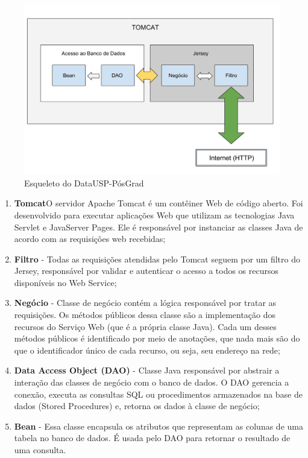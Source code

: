 \begin{figure}[H]
    \includegraphics[width=\textwidth]{figuras/skel}
    \caption{Esqueleto do DataUSP-PósGrad}
    \label{fig:skel}
\end{figure} 

\begin{enumerate}
\item \textbf{Tomcat}O servidor Apache Tomcat é um contêiner Web de código aberto. Foi desenvolvido para executar aplicações Web que utilizam as tecnologias Java Servlet e JavaServer Pages. Ele é responsável por instanciar as classes Java de acordo com as requisições web recebidas;

\item \textbf{Filtro} - Todas as requisições atendidas pelo Tomcat seguem por um filtro do Jersey, responsável por validar e autenticar o acesso a todos os recursos disponíveis no Web Service;

\item \textbf{Negócio} - Classe de negócio contém a lógica responsável por tratar as requisições. Os métodos públicos dessa classe são a implementação dos recursos do Serviço Web (que é a própria classe Java). Cada um desses métodos públicos é identificado por meio de anotações, que nada mais são do que o identificador único de cada recurso, ou seja, seu endereço na rede;

\item \textbf{Data Access Object (DAO)} -  Classe Java responsável por abstrair a interação das classes de negócio com o banco de dados. O DAO gerencia a conexão, executa as consultas SQL ou procedimentos armazenados na base de dados (Stored Procedures) e, retorna os dados à classe de negócio;

\item \textbf{Bean} - Essa classe encapsula os atributos que representam as colunas de uma tabela no banco de dados. É usada pelo DAO para retornar o resultado de uma consulta.
\end{enumerate}

